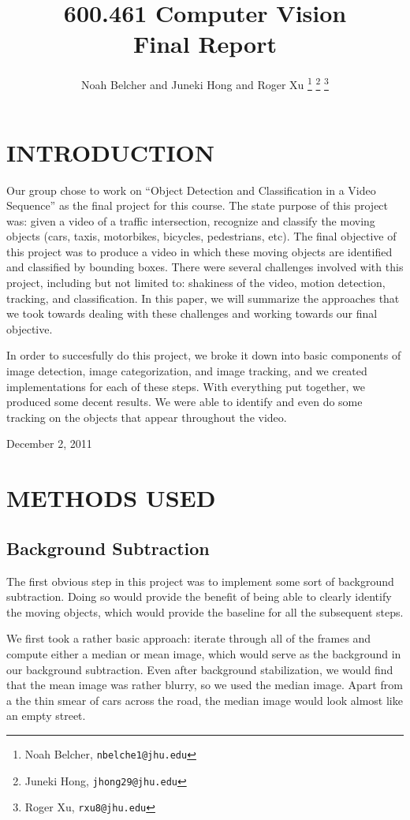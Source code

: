 \documentclass[a4paper, 10pt, conference]{ieeeconf}      %
\title{\LARGE \bf
600.461 Computer Vision\\Final Report
}
\author{Noah Belcher and Juneki Hong and Roger Xu%
\thanks{Noah Belcher,
        {\tt\small nbelche1@jhu.edu}}%
\thanks{Juneki Hong,
        {\tt\small jhong29@jhu.edu}}%
\thanks{Roger Xu,
		{\tt\small rxu8@jhu.edu}}%
}
\begin{document}
\maketitle
\thispagestyle{empty}
\pagestyle{empty}


\section{INTRODUCTION}

Our group chose to work on “Object Detection and Classification in a Video Sequence” as the final project for this course. The state purpose of this project was: given a video of a traffic intersection, recognize and classify the moving objects (cars, taxis, motorbikes, bicycles, pedestrians, etc). The final objective of this project was to produce a video in which these moving objects are identified and classified by bounding boxes. There were several challenges involved with this project, including but not limited to: shakiness of the video, motion detection, tracking, and classification. In this paper, we will summarize the approaches that we took towards dealing with these challenges and working towards our final objective. \newline


In order to succesfully do this project, we broke it down into basic components of image detection, image categorization, and image tracking, and we created implementations for each of these steps. With everything put together, we produced some decent results. We were able to identify and even do some tracking on the objects that appear throughout the video. 


\hfill December 2, 2011


\section{METHODS USED}

\subsection{Background Subtraction}
The first obvious step in this project was to implement some sort of background subtraction. Doing so would provide the benefit of being able to clearly identify the moving objects, which would provide the baseline for all the subsequent steps. \newline

We first took a rather basic approach: iterate through all of the frames and compute either a median or mean image, which would serve as the background in our background subtraction. Even after background stabilization, we would find that the mean image was rather blurry, so we used the median image. Apart from a the thin smear of cars across the road, the median image would look almost like an empty street. \newline
\end{document}

